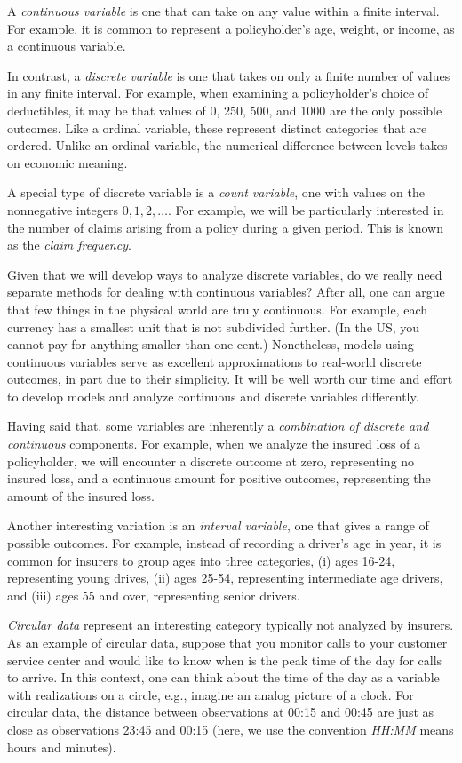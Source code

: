 \documentclass[]{book}
\begin{document}
A \emph{continuous variable} is one that can take on any value within a
finite interval. For example, it is common to represent a policyholder's
age, weight, or income, as a continuous variable.

In contrast, a \emph{discrete variable} is one that takes on only a
finite number of values in any finite interval. For example, when
examining a policyholder's choice of deductibles, it may be that values
of 0, 250, 500, and 1000 are the only possible outcomes. Like a ordinal
variable, these represent distinct categories that are ordered. Unlike
an ordinal variable, the numerical difference between levels takes on
economic meaning.

A special type of discrete variable is a \emph{count variable}, one with
values on the nonnegative integers \(0, 1, 2, \ldots.\) For example, we
will be particularly interested in the number of claims arising from a
policy during a given period. This is known as the \emph{claim
frequency}.

Given that we will develop ways to analyze discrete variables, do we
really need separate methods for dealing with continuous variables?
After all, one can argue that few things in the physical world are truly
continuous. For example, each currency has a smallest unit that is not
subdivided further. (In the US, you cannot pay for anything smaller than
one cent.) Nonetheless, models using continuous variables serve as
excellent approximations to real-world discrete outcomes, in part due to
their simplicity. It will be well worth our time and effort to develop
models and analyze continuous and discrete variables differently.

Having said that, some variables are inherently a \emph{combination of
discrete and continuous} components. For example, when we analyze the
insured loss of a policyholder, we will encounter a discrete outcome at
zero, representing no insured loss, and a continuous amount for positive
outcomes, representing the amount of the insured loss.

Another interesting variation is an \emph{interval variable}, one that
gives a range of possible outcomes. For example, instead of recording a
driver's age in year, it is common for insurers to group ages into three
categories, (i) ages 16-24, representing young drives, (ii) ages 25-54,
representing intermediate age drivers, and (iii) ages 55 and over,
representing senior drivers.

\emph{Circular data} represent an interesting category typically not
analyzed by insurers. As an example of circular data, suppose that you
monitor calls to your customer service center and would like to know
when is the peak time of the day for calls to arrive. In this context,
one can think about the time of the day as a variable with realizations
on a circle, e.g., imagine an analog picture of a clock. For circular
data, the distance between observations at 00:15 and 00:45 are just as
close as observations 23:45 and 00:15 (here, we use the convention
\emph{HH:MM} means hours and minutes).
\end{document}
